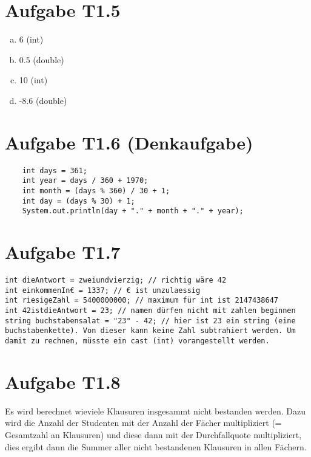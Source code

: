 \documentclass[final,a4paper]{article}
\begin{document}
\section*{Aufgabe T1.5}
\begin{enumerate}[(a)]
\item 6 	(int) 
\item 0.5 	(double)
\item 10 	(int)
\item -8.6 	(double)
\end{enumerate}
\section*{Aufgabe T1.6 (Denkaufgabe)}
\begin{lstlisting}
	int days = 361;
	int year = days / 360 + 1970;
	int month = (days % 360) / 30 + 1;
	int day = (days % 30) + 1;
	System.out.println(day + "." + month + "." + year);
\end{lstlisting}


\section*{Aufgabe T1.7}
\begin{lstlisting}
int dieAntwort = zweiundvierzig; // richtig wäre 42
int einkommenIn€ = 1337; // € ist unzulaessig
int riesigeZahl = 5400000000; // maximum für int ist 2147438647
int 42istdieAntwort = 23; // namen dürfen nicht mit zahlen beginnen
string buchstabensalat = "23" - 42; // hier ist 23 ein string (eine buchstabenkette). Von dieser kann keine Zahl subtrahiert werden. Um damit zu rechnen, müsste ein cast (int) vorangestellt werden.
\end{lstlisting}

\section*{Aufgabe T1.8}
Es wird berechnet wieviele Klausuren insgesammt nicht bestanden werden. Dazu wird die Anzahl der Studenten mit der Anzahl der Fächer multipliziert (= Gesamtzahl an Klausuren) und diese dann mit der Durchfallquote multipliziert, dies ergibt dann die Summer aller nicht bestandenen Klausuren in allen Fächern.
\end{document}
